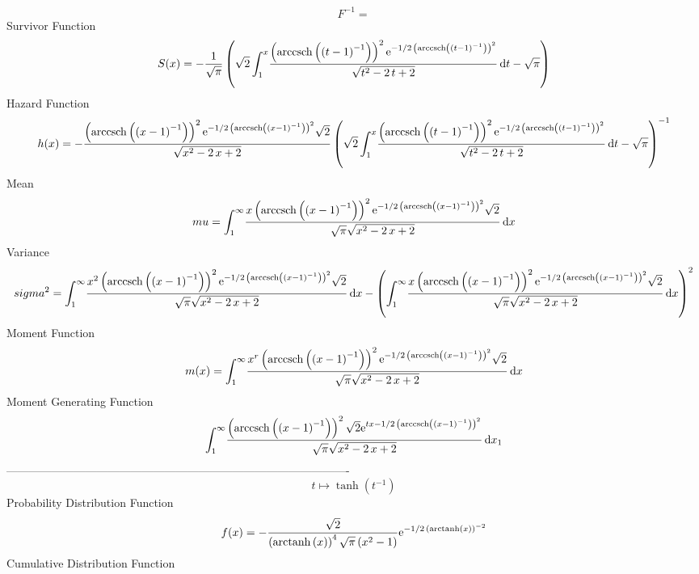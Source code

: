 \documentclass[12pt]{article}
\begin{document}
  $$F^{-1} = $$Survivor Function 
 $$ S(x)=-{\frac {1}{\sqrt {\pi}} \left( \sqrt {2}\int_{1}^{x}\!{\frac {
 \left( {\rm arccsch} \left( \left( t-1 \right) ^{-1}\right) \right) ^
{2}{{\rm e}^{-1/2\, \left( {\rm arccsch} \left( \left( t-1 \right) ^{-
1}\right) \right) ^{2}}}}{\sqrt {{t}^{2}-2\,t+2}}}\,{\rm d}t-\sqrt {
\pi} \right) }
$$ Hazard Function 
 $$ h(x)=-{\frac { \left( {\rm arccsch} \left( \left( x-1 \right) ^{-1}\right)
 \right) ^{2}{{\rm e}^{-1/2\, \left( {\rm arccsch} \left( \left( x-1
 \right) ^{-1}\right) \right) ^{2}}}\sqrt {2}}{\sqrt {{x}^{2}-2\,x+2}}
 \left( \sqrt {2}\int_{1}^{x}\!{\frac { \left( {\rm arccsch} \left(
 \left( t-1 \right) ^{-1}\right) \right) ^{2}{{\rm e}^{-1/2\, \left( 
{\rm arccsch} \left( \left( t-1 \right) ^{-1}\right) \right) ^{2}}}}{
\sqrt {{t}^{2}-2\,t+2}}}\,{\rm d}t-\sqrt {\pi} \right) ^{-1}}
$$Mean 
 $$ mu=\int_{1}^{\infty }\!{\frac {x \left( {\rm arccsch} \left( \left( x-1
 \right) ^{-1}\right) \right) ^{2}{{\rm e}^{-1/2\, \left( 
{\rm arccsch} \left( \left( x-1 \right) ^{-1}\right) \right) ^{2}}}
\sqrt {2}}{\sqrt {\pi}\sqrt {{x}^{2}-2\,x+2}}}\,{\rm d}x
$$ Variance 
 $$ sigma^2 = \int_{1}^{\infty }\!{\frac {{x}^{2} \left( {\rm arccsch} \left(
 \left( x-1 \right) ^{-1}\right) \right) ^{2}{{\rm e}^{-1/2\, \left( 
{\rm arccsch} \left( \left( x-1 \right) ^{-1}\right) \right) ^{2}}}
\sqrt {2}}{\sqrt {\pi}\sqrt {{x}^{2}-2\,x+2}}}\,{\rm d}x- \left( \int_
{1}^{\infty }\!{\frac {x \left( {\rm arccsch} \left( \left( x-1
 \right) ^{-1}\right) \right) ^{2}{{\rm e}^{-1/2\, \left( 
{\rm arccsch} \left( \left( x-1 \right) ^{-1}\right) \right) ^{2}}}
\sqrt {2}}{\sqrt {\pi}\sqrt {{x}^{2}-2\,x+2}}}\,{\rm d}x \right) ^{2}
$$Moment Function 
 $$ m(x) = \int_{1}^{\infty }\!{\frac {{x}^{r} \left( {\rm arccsch} \left(
 \left( x-1 \right) ^{-1}\right) \right) ^{2}{{\rm e}^{-1/2\, \left( 
{\rm arccsch} \left( \left( x-1 \right) ^{-1}\right) \right) ^{2}}}
\sqrt {2}}{\sqrt {\pi}\sqrt {{x}^{2}-2\,x+2}}}\,{\rm d}x
$$ Moment Generating Function 
 $$\int_{1}^{\infty }\!{\frac { \left( {\rm arccsch} \left( \left( x-1
 \right) ^{-1}\right) \right) ^{2}\sqrt {2}{{\rm e}^{tx-1/2\, \left( 
{\rm arccsch} \left( \left( x-1 \right) ^{-1}\right) \right) ^{2}}}}{
\sqrt {\pi}\sqrt {{x}^{2}-2\,x+2}}}\,{\rm d}x_{{1}}
$$-------------------------------------------------------------------------------------------  \\$$t\mapsto \tanh \left( {t}^{-1} \right) 
$$Probability Distribution Function 
$$  f(x)=-{\frac {\sqrt {2}}{ \left( {\rm arctanh} \left(x\right) \right) ^{4}
\sqrt {\pi} \left( {x}^{2}-1 \right) }{{\rm e}^{-1/2\, \left( 
{\rm arctanh} \left(x\right) \right) ^{-2}}}}
$$Cumulative Distribution Function  
\end{document}
